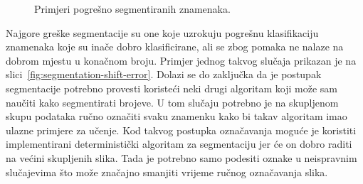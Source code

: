 \begin{figure}[htb]
    \caption{Primjeri pogrešno segmentiranih znamenaka.}
    \label{fig:segmentation-errors}
\end{figure}
\newline
Najgore greške segmentacije su one koje uzrokuju pogrešnu klasifikaciju znamenaka koje su inače dobro klasificirane, ali
se zbog pomaka ne nalaze na dobrom mjestu u konačnom broju. Primjer jednog takvog slučaja prikazan je na
slici\ \ref{fig:segmentation-shift-error}.
Dolazi se do zaključka da je postupak segmentacije potrebno provesti koristeći neki drugi algoritam koji može sam
naučiti kako segmentirati brojeve. U tom slučaju potrebno je na skupljenom skupu podataka ručno označiti svaku znamenku
kako bi takav algoritam imao ulazne primjere za učenje. Kod takvog postupka označavanja moguće je koristiti
implementirani deterministički algoritam za segmentaciju jer će on dobro raditi na većini skupljenih slika. Tada je
potrebno samo podesiti oznake u neispravnim slučajevima što može značajno smanjiti vrijeme ručnog označavanja slika.
